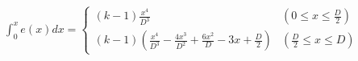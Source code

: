 \documentclass[
  11pt,
  border=2,
  convert={
    density=100 -alpha remove,
    outext=.png
  },
]{standalone}
\begin{document}
$
  \displaystyle \int_0^x e(x) dx = \begin{cases}
    \displaystyle (k-1)\frac{x^4}{D^3} 
      & \left(0 \leq x \leq \frac{D}{2}\right)
    \\
    \displaystyle (k-1)\left( \frac{x^4}{D^3} - \frac{4x^3}{D^2} + \frac{6x^2}{D} - 3x + \frac{D}{2} \right) 
      & \left(\frac{D}{2} \leq x \leq D\right)
  \end{cases}
$
\end{document}

